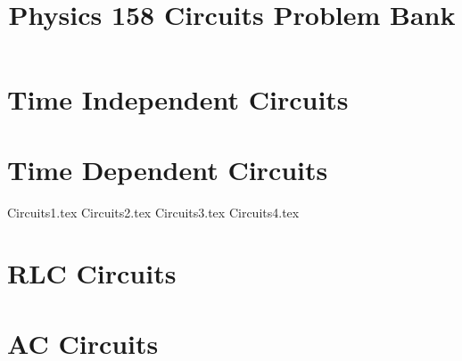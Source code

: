 \documentclass[11pt, fleqn]{article}
\title{Physics 158 Circuits Problem Bank}
\author{}
\date{}
\begin{document}
\allowdisplaybreaks

\maketitle

\section*{Time Independent Circuits}

\section*{Time Dependent Circuits}
{Circuits1.tex}
{Circuits2.tex}
{Circuits3.tex}
{Circuits4.tex}

\section*{RLC Circuits}

\section*{AC Circuits}
\end{document}
